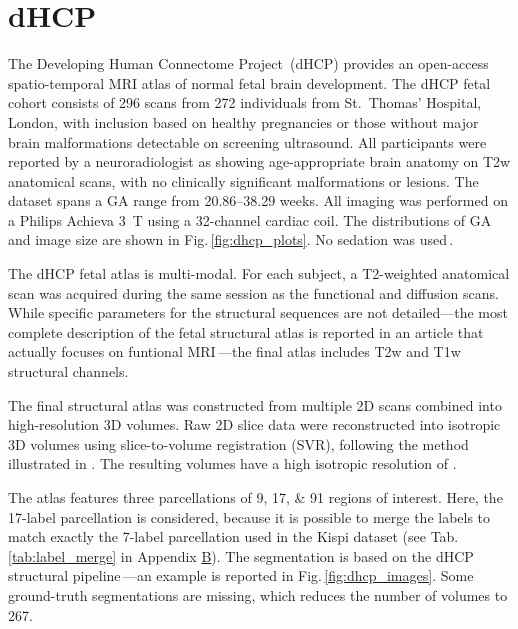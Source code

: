 \section{dHCP}
The Developing Human Connectome Project\,\cite{dHCP} (dHCP) provides an open-access spatio-temporal MRI atlas of normal fetal brain development. The dHCP fetal cohort consists of \num{296} scans from \num{272} individuals from St.\ Thomas' Hospital, London, with inclusion based on healthy pregnancies or those without major brain malformations detectable on screening ultrasound. All participants were reported by a neuroradiologist as showing age-appropriate brain anatomy on T2w anatomical scans, with no clinically significant malformations or lesions. The dataset spans a GA range from \numrange{20.86}{38.29} weeks. All imaging was performed on a Philips Achieva \qty{3}{\tesla} using a 32-channel cardiac coil. The distributions of GA and image size are shown in Fig.\,\ref{fig:dhcp_plots}. No sedation was used\,\cite{Karolis2025}.

The dHCP fetal atlas is multi-modal. For each subject, a T2-weighted anatomical scan was acquired during the same session as the functional and diffusion scans. While specific parameters for the structural sequences are not detailed---the most complete description of the fetal structural atlas is reported in an article that actually focuses on funtional MRI\,\cite{Karolis2025}---the final atlas includes T2w and T1w structural channels.

The final structural atlas was constructed from multiple 2D scans combined into high-resolution 3D volumes. Raw 2D slice data were reconstructed into isotropic 3D volumes using slice-to-volume registration (SVR), following the method illustrated in \cite{CorderoGrande2018}. The resulting volumes have a high isotropic resolution of .

The atlas features three parcellations of \numlist{9;17;91} regions of interest. Here, the 17-label parcellation is considered, because it is possible to merge the labels to match exactly the 7-label parcellation used in the Kispi dataset (see Tab.\,\ref{tab:label_merge} in Appendix \hyperref[app:SupplementaryTables]{B}). The segmentation is based on the dHCP structural pipeline\,\cite{Makropoulos2018, dHCP_pipeline}---an example is reported in Fig.\,\ref{fig:dhcp_images}. Some ground-truth segmentations are missing, which reduces the number of volumes to \num{267}.

